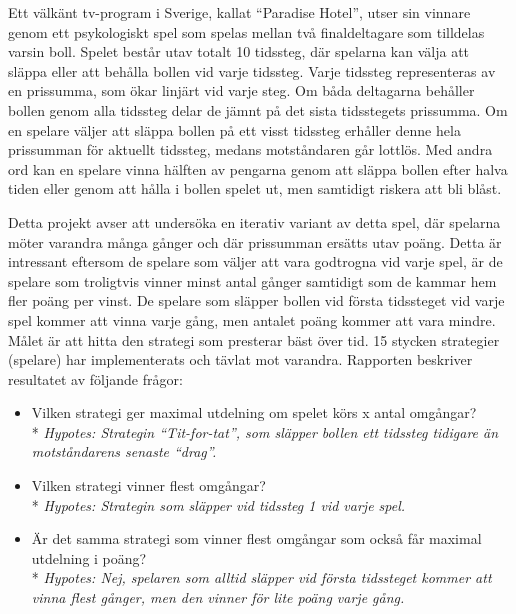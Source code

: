 Ett välkänt tv-program i Sverige, kallat “Paradise Hotel”, utser sin vinnare genom ett psykologiskt spel som spelas mellan två finaldeltagare som tilldelas varsin boll. Spelet består utav totalt 10 tidssteg, där spelarna kan välja att släppa eller att behålla bollen vid varje tidssteg. Varje tidssteg representeras av en prissumma, som ökar linjärt vid varje steg. Om båda deltagarna behåller bollen genom alla tidssteg delar de jämnt på det sista tidsstegets prissumma. Om en spelare väljer att släppa bollen på ett visst tidssteg erhåller denne hela prissumman för aktuellt tidssteg, medans motståndaren går lottlös. Med andra ord kan en spelare vinna hälften av pengarna genom att släppa bollen efter halva tiden eller genom att hålla i bollen spelet ut, men samtidigt riskera att bli blåst.

Detta projekt avser att undersöka en iterativ variant av detta spel, där spelarna möter varandra många gånger och där prissumman ersätts utav poäng. Detta är intressant eftersom de spelare som väljer att vara godtrogna vid varje spel, är de spelare som troligtvis vinner minst antal gånger samtidigt som de kammar hem fler poäng per vinst. De spelare som släpper bollen vid första tidssteget vid varje spel kommer att vinna varje gång, men antalet poäng kommer att vara mindre. Målet är att hitta den strategi som presterar bäst över tid. 15 stycken strategier (spelare) har implementerats och tävlat mot varandra. Rapporten beskriver resultatet av följande frågor:

\begin{itemize}
\item \nohyphens{Vilken strategi ger maximal utdelning om spelet körs x antal omgångar?}\\*
	\emph{Hypotes: Strategin “Tit-for-tat”, som släpper bollen ett tidssteg tidigare än motståndarens senaste “drag”.}
\item Vilken strategi vinner flest omgångar?\\*
	\emph{Hypotes: Strategin som släpper vid tidssteg 1 vid varje spel.}
\item \nohyphens{Är det samma strategi som vinner flest omgångar som också får maximal utdelning i poäng?}\\*
	\emph{Hypotes: Nej, spelaren som alltid släpper vid första tidssteget kommer att vinna flest gånger, men den vinner för lite poäng varje gång.}
\end{itemize}